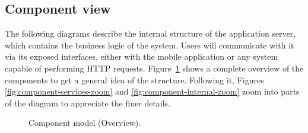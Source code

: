 \subsection{Component view} \label{sub-sect:component-view}
The following diagrams describe the internal structure of the application server, which contains the business logic of the system. Users will communicate with it via its exposed interfaces, either with the mobile application or any system capable of performing HTTP requests.
Figure~\ref{fig:component-overview} shows a complete overview of the components to get a general idea of the structure. Following it, Figures \ref{fig:component-services-zoom} and \ref{fig:component-internal-zoom} zoom into parts of the diagram to appreciate the finer details.

\begin{figure}[H]
\centering
{}
\caption{\label{fig:component-overview}Component model (Overview).}
\end{figure}

